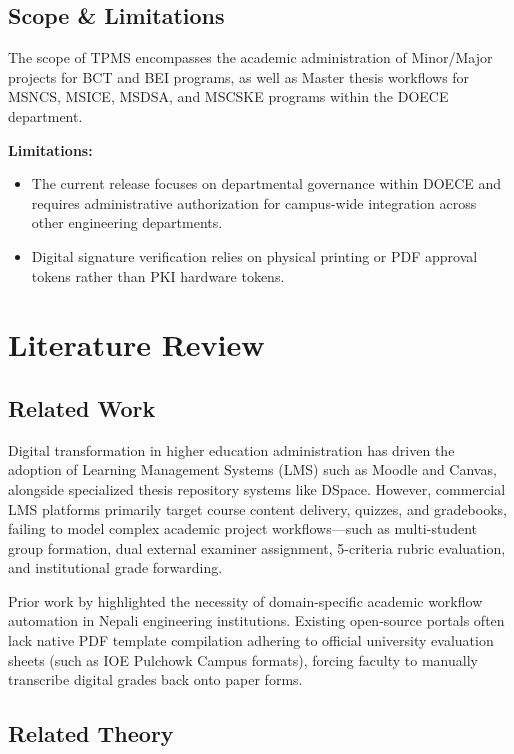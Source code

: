 \documentclass[12pt]{report}
\begin{document}
\section{Scope \& Limitations}
The scope of TPMS encompasses the academic administration of Minor/Major projects for BCT and BEI programs, as well as Master thesis workflows for MSNCS, MSICE, MSDSA, and MSCSKE programs within the DOECE department.

\textbf{Limitations:}
\begin{itemize}
    \item The current release focuses on departmental governance within DOECE and requires administrative authorization for campus-wide integration across other engineering departments.
    \item Digital signature verification relies on physical printing or PDF approval tokens rather than PKI hardware tokens.
\end{itemize}

\chapter{Literature Review}

\section{Related Work}
Digital transformation in higher education administration has driven the adoption of Learning Management Systems (LMS) such as Moodle and Canvas, alongside specialized thesis repository systems like DSpace. However, commercial LMS platforms primarily target course content delivery, quizzes, and gradebooks, failing to model complex academic project workflows—such as multi-student group formation, dual external examiner assignment, 5-criteria rubric evaluation, and institutional grade forwarding.

Prior work by \citet{giri2019transfer} highlighted the necessity of domain-specific academic workflow automation in Nepali engineering institutions. Existing open-source portals often lack native PDF template compilation adhering to official university evaluation sheets (such as IOE Pulchowk Campus formats), forcing faculty to manually transcribe digital grades back onto paper forms.

\section{Related Theory}
\end{document}
